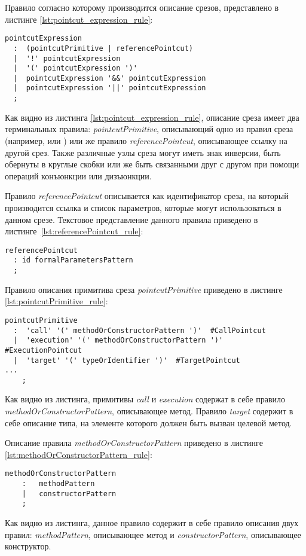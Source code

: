 Правило согласно которому производится описание срезов, представлено в листинге
\ref{lst:pointcut_expression_rule}:
\begin{lstlisting}[style={java}, label={lst:pointcut_expression_rule},
  caption={Правило описания среза pointcutExpression}]
pointcutExpression
  :  (pointcutPrimitive | referencePointcut)
  |  '!' pointcutExpression
  |  '(' pointcutExpression ')'
  |  pointcutExpression '&&' pointcutExpression
  |  pointcutExpression '||' pointcutExpression
  ;
\end{lstlisting}
Как видно из листинга \ref{lst:pointcut_expression_rule}, описание среза имеет
два терминальных правила: \textit{pointcutPrimitive}, описывающий одно из
правил среза (например,  или ) или же правило
\textit{referencePointcut}, описывающее ссылку на другой срез.
Также различные узлы среза могут иметь знак инверсии, быть обернуты в круглые
скобки или же быть связанными друг с другом при помощи операций конъюнкции или
дизъюнкции.

Правило \textit{referencePointcut} описывается как идентификатор среза, на который производится ссылка и список параметров, которые могут использоваться в данном срезе.
Текстовое представление данного правила приведено в листинге~\ref{lst:referencePointcut_rule}:
\begin{lstlisting}[style={java}, label={lst:referencePointcut_rule},
  caption={Правило описания ссылки на другой срез referencePointcut}]
referencePointcut
  : id formalParametersPattern
  ;
\end{lstlisting}

Правило описания примитива среза \textit{pointcutPrimitive} приведено в листинге
\ref{lst:pointcutPrimitive_rule}:
\begin{lstlisting}[style={java}, label={lst:pointcutPrimitive_rule},
  caption={Правило описания ссылки на другой срез referencePointcut}]
pointcutPrimitive
  :  'call' '(' methodOrConstructorPattern ')'  #CallPointcut
  |  'execution' '(' methodOrConstructorPattern ')'  #ExecutionPointcut
  |  'target' '(' typeOrIdentifier ')'  #TargetPointcut
...
	;
\end{lstlisting}
Как видно из листинга, примитивы \textit{call} и \textit{execution} содержат в себе правило \textit{methodOrConstructorPattern}, описывающее метод.
Правило \textit{target} содержит в себе описание типа, на элементе которого должен быть вызван целевой метод.

Описание правила \textit{methodOrConstructorPattern} приведено в листинге \ref{lst:methodOrConstructorPattern_rule}:
\begin{lstlisting}[style={java}, label={lst:methodOrConstructorPattern_rule},
  caption={Правило methodOrConstructorPattern}]
methodOrConstructorPattern
	:	methodPattern
	|	constructorPattern
	;
\end{lstlisting}
Как видно из листинга, данное правило содержит в себе правило описания двух правил: \textit{methodPattern}, описывающее метод и \textit{constructorPattern},
описывающее конструктор.

